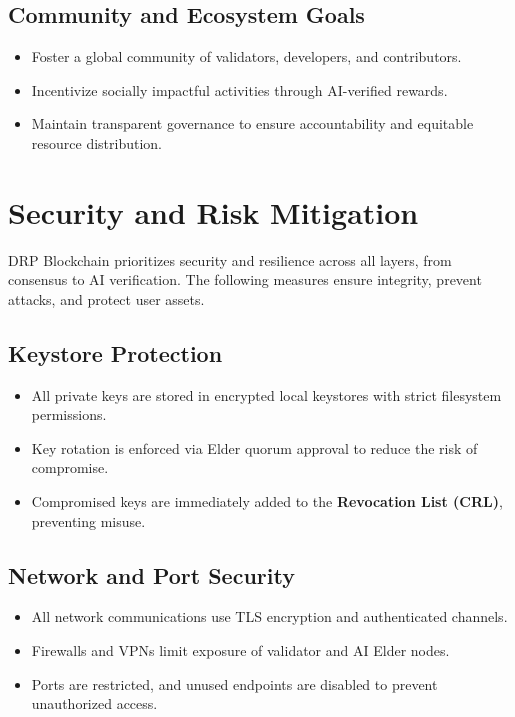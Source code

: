 \documentclass[11pt,a4paper]{article}
\begin{document}
\subsection{Community and Ecosystem Goals}
\begin{itemize}
    \item Foster a global community of validators, developers, and contributors.  
    \item Incentivize socially impactful activities through AI-verified rewards.  
    \item Maintain transparent governance to ensure accountability and equitable resource distribution.  
\end{itemize}

\section{Security and Risk Mitigation}

DRP Blockchain prioritizes security and resilience across all layers, from consensus to AI verification. The following measures ensure integrity, prevent attacks, and protect user assets.

\subsection{Keystore Protection}
\begin{itemize}
    \item All private keys are stored in encrypted local keystores with strict filesystem permissions.  
    \item Key rotation is enforced via Elder quorum approval to reduce the risk of compromise.  
    \item Compromised keys are immediately added to the \textbf{Revocation List (CRL)}, preventing misuse.  
\end{itemize}

\subsection{Network and Port Security}
\begin{itemize}
    \item All network communications use TLS encryption and authenticated channels.  
    \item Firewalls and VPNs limit exposure of validator and AI Elder nodes.  
    \item Ports are restricted, and unused endpoints are disabled to prevent unauthorized access.  
\end{itemize}
\end{document}
